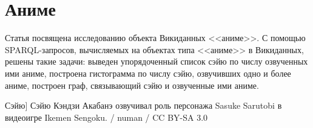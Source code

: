 
\chapter{Аниме}
Статья посвящена исследованию объекта Викиданных <<аниме>>. С помощью SPARQL-запросов, вычисляемых на объектах типа <<аниме>>
в Викиданных, решены такие задачи: выведен упорядоченный список сэйю по числу озвученных ими аниме, построена гистограмма по числу сэйю, озвучивших одно и более аниме, построен граф, связывающий сэйю и озвученные ими аниме. 


\begin{marginfigure}[0.0cm]
{
	\setlength{\fboxsep}{0pt}%
	\setlength{\fboxrule}{1pt}%
}
\caption
[Сэйю]
{
Сэйю Кэндзи Акабанэ озвучивал роль персонажа Sasuke Sarutobi в видеоигре Ikemen Sengoku. / numan / CC BY-SA 3.0
}
\label{fig:seyu}
\end{marginfigure}

\label{ch:anime}


